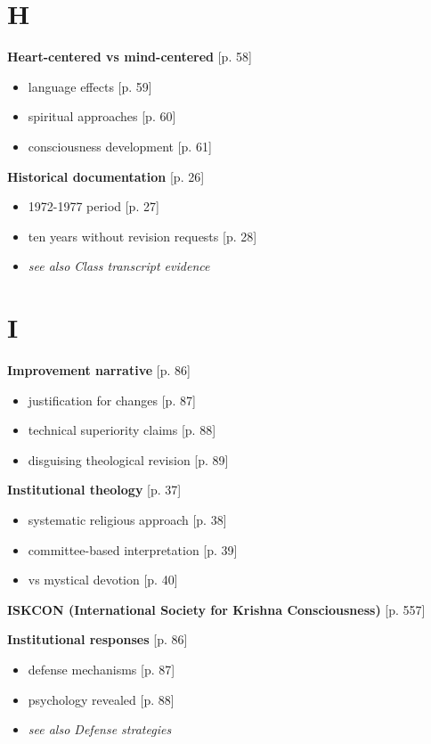 \documentclass[11pt,twoside]{book}
\begin{document}
\section*{H}
\label{sec:org76d50c4}

\textbf{\textbf{Heart-centered vs mind-centered}} {[}p. 58]
\begin{itemize}
\item language effects [p. 59]
\item spiritual approaches [p. 60]
\item consciousness development [p. 61]
\end{itemize}

\textbf{\textbf{Historical documentation}} {[}p. 26]
\begin{itemize}
\item 1972-1977 period [p. 27]
\item ten years without revision requests [p. 28]
\item \emph{see also Class transcript evidence}
\end{itemize}
\section*{I}
\label{sec:orgc817a18}

\textbf{\textbf{Improvement narrative}} {[}p. 86]
\begin{itemize}
\item justification for changes [p. 87]
\item technical superiority claims [p. 88]
\item disguising theological revision [p. 89]
\end{itemize}

\textbf{\textbf{Institutional theology}} {[}p. 37]
\begin{itemize}
\item systematic religious approach [p. 38]
\item committee-based interpretation [p. 39]
\item vs mystical devotion [p. 40]
\end{itemize}

\textbf{\textbf{ISKCON (International Society for Krishna Consciousness)}} {[}p. 557]

\textbf{\textbf{Institutional responses}} {[}p. 86]
\begin{itemize}
\item defense mechanisms [p. 87]
\item psychology revealed [p. 88]
\item \emph{see also Defense strategies}
\end{itemize}
\end{document}
